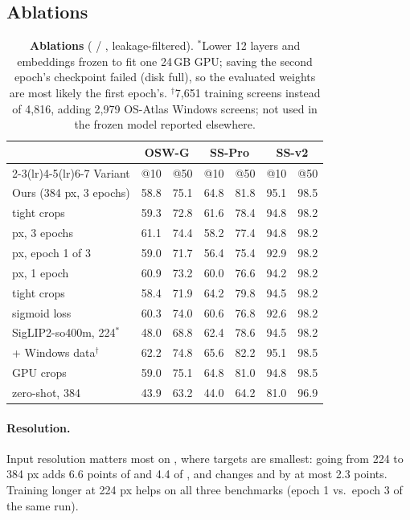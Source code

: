 \subsection{Ablations}
\label{sec:ablations}

\begin{table}[t]
\centering
\small
\setlength{\tabcolsep}{2.5pt}
\begin{tabular}{l cc cc cc}
\toprule
& \multicolumn{2}{c}{OSW-G} & \multicolumn{2}{c}{SS-Pro} & \multicolumn{2}{c}{SS-v2} \\
\cmidrule(lr){2-3}\cmidrule(lr){4-5}\cmidrule(lr){6-7}
Variant & @10 & @50 & @10 & @50 & @10 & @50 \\
\midrule
Ours (384 px, 3 epochs) & 58.8 & 75.1 & 64.8 & 81.8 & 95.1 & 98.5 \\
\quad tight crops & 59.3 & 72.8 & 61.6 & 78.4 & 94.8 & 98.2 \\
\quad 224 px, 3 epochs & 61.1 & 74.4 & 58.2 & 77.4 & 94.8 & 98.2 \\
\quad 224 px, epoch 1 of 3 & 59.0 & 71.7 & 56.4 & 75.4 & 92.9 & 98.2 \\
\quad 224 px, 1 epoch & 60.9 & 73.2 & 60.0 & 76.6 & 94.2 & 98.2 \\
\qquad tight crops & 58.4 & 71.9 & 64.2 & 79.8 & 94.5 & 98.2 \\
\qquad sigmoid loss & 60.3 & 74.0 & 60.6 & 76.8 & 92.6 & 98.2 \\
\quad SigLIP2-so400m, 224$^\ast$ & 48.0 & 68.8 & 62.4 & 78.6 & 94.5 & 98.2 \\
\quad + Windows data$^\dagger$ & 62.2 & 74.8 & 65.6 & 82.2 & 95.1 & 98.5 \\
\quad GPU crops & 59.0 & 75.1 & 64.8 & 81.0 & 94.8 & 98.5 \\
\quad zero-shot, 384 & 43.9 & 63.2 & 44.0 & 64.2 & 81.0 & 96.9 \\
\bottomrule
\end{tabular}
\caption{\textbf{Ablations} ( / , leakage-filtered). $^\ast$Lower 12 layers and embeddings frozen
to fit one 24\,GB GPU; saving the second epoch's checkpoint failed (disk full), so the evaluated weights are most likely the first epoch's. $^\dagger$7,651 training screens instead of 4,816, adding 2,979 OS-Atlas Windows screens; not used in the frozen model reported elsewhere.}
\label{tab:ablations}
\end{table}

\paragraph{Resolution.} Input resolution matters most on \sspro, where targets are smallest: going from 224 to
384 px adds 6.6 points of  and 4.4 of , and changes \osw and \ssv by at most 2.3 points. Training
longer at 224 px helps on all three benchmarks (epoch 1 vs.\ epoch 3 of the same run).

